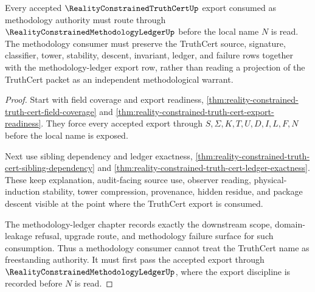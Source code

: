 \begin{theorem}
\label{thm:reality-constrained-truth-cert-methodology-ledger-handoff}
Every accepted $\RealityConstrainedTruthCertUp$ export consumed as methodology authority must route through $\RealityConstrainedMethodologyLedgerUp$ before the local name $N$ is read. The methodology consumer must preserve the TruthCert source, signature, classifier, tower, stability, descent, invariant, ledger, and failure rows together with the methodology-ledger export row, rather than reading a projection of the TruthCert packet as an independent methodological warrant.
\end{theorem}
\begin{proof}
Start with field coverage and export readiness, \autoref{thm:reality-constrained-truth-cert-field-coverage} and \autoref{thm:reality-constrained-truth-cert-export-readiness}. They force every accepted export through $S,\Sigma,K,T,U,D,I,L,F,N$ before the local name is exposed.

Next use sibling dependency and ledger exactness, \autoref{thm:reality-constrained-truth-cert-sibling-dependency} and \autoref{thm:reality-constrained-truth-cert-ledger-exactness}. These keep explanation, audit-facing source use, observer reading, physical-induction stability, tower compression, provenance, hidden residue, and package descent visible at the point where the TruthCert export is consumed.

The methodology-ledger chapter records exactly the downstream scope, domain-leakage refusal, upgrade route, and methodology failure surface for such consumption. Thus a methodology consumer cannot treat the TruthCert name as freestanding authority. It must first pass the accepted export through $\RealityConstrainedMethodologyLedgerUp$, where the export discipline is recorded before $N$ is read.
\end{proof}

